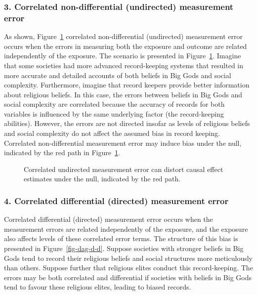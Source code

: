 \documentclass[
  singlecolumn]{article}
\begin{document}
\subsubsection{3. Correlated non-differential (undirected) measurement
error}\label{correlated-non-differential-undirected-measurement-error}

As shown, Figure~\ref{fig-dag-dep-u-effect} correlated non-differential
(undirected) measurement error occurs when the errors in measuring both
the exposure and outcome are related independently of the exposure. The
scenario is presented in Figure~\ref{fig-dag-dep-u-effect}. Imagine that
some societies had more advanced record-keeping systems that resulted in
more accurate and detailed accounts of both beliefs in Big Gods and
social complexity. Furthermore, imagine that record keepers provide
better information about religious beliefs. In this case, the errors
between beliefs in Big Gods and social complexity are correlated because
the accuracy of records for both variables is influenced by the same
underlying factor (the record-keeping abilities). However, the errors
are not directed insofar as levels of religious beliefs and social
complexity do not affect the assumed bias in record keeping. Correlated
non-differential measurement error may induce bias under the null,
indicated by the red path in Figure~\ref{fig-dag-dep-u-effect}.

\begin{figure}


\caption{\label{fig-dag-dep-u-effect}Correlated undirected measurement
error can distort causal effect estimates under the null, indicated by
the red path.}

\end{figure}%

\subsubsection{4. Correlated differential (directed) measurement
error}\label{correlated-differential-directed-measurement-error}

Correlated differential (directed) measurement error occurs when the
measurement errors are related independently of the exposure, and the
exposure also affects levels of these correlated error terms. The
structure of this bias is presented in Figure~\ref{fig-dag-d-d}. Suppose
societies with stronger beliefs in Big Gods tend to record their
religious beliefs and social structures more meticulously than others.
Suppose further that religious elites conduct this record-keeping. The
errors may be both correlated and differential if societies with beliefs
in Big Gods tend to favour these religious elites, leading to biased
records.
\end{document}
